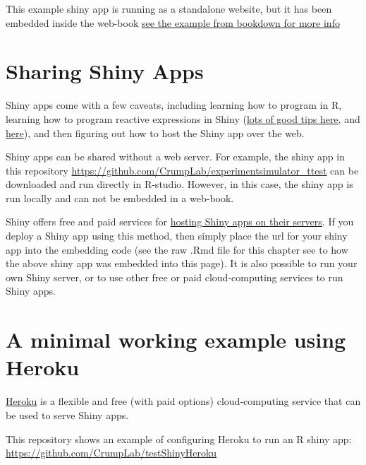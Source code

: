\documentclass[]{book}
\theoremstyle{definition}
\theoremstyle{definition}
\theoremstyle{definition}
\theoremstyle{remark}
\begin{document}
This example shiny app is running as a standalone website, but it has
been embedded inside the web-book
\href{https://bookdown.org/yihui/bookdown/web-pages-and-shiny-apps.html}{see
the example from bookdown for more info}

\section{Sharing Shiny Apps}\label{sharing-shiny-apps}

Shiny apps come with a few caveats, including learning how to program in
R, learning how to program reactive expressions in Shiny
(\href{https://shiny.rstudio.com/tutorial/}{lots of good tips here}, and
\href{https://shiny.rstudio.com/articles/}{here}), and then figuring out
how to host the Shiny app over the web.

Shiny apps can be shared without a web server. For example, the shiny
app in this repository
\url{https://github.com/CrumpLab/experimentsimulator_ttest} can be
downloaded and run directly in R-studio. However, in this case, the
shiny app is run locally and can not be embedded in a web-book.

Shiny offers free and paid services for
\href{https://www.shinyapps.io}{hosting Shiny apps on their servers}. If
you deploy a Shiny app using this method, then simply place the url for
your shiny app into the embedding code (see the raw .Rmd file for this
chapter see to how the above shiny app was embedded into this page). It
is also possible to run your own Shiny server, or to use other free or
paid cloud-computing services to run Shiny apps.

\section{A minimal working example using
Heroku}\label{a-minimal-working-example-using-heroku}

\href{https://www.heroku.com}{Heroku} is a flexible and free (with paid
options) cloud-computing service that can be used to serve Shiny apps.

This repository shows an example of configuring Heroku to run an R shiny
app: \url{https://github.com/CrumpLab/testShinyHeroku}


\end{document}
